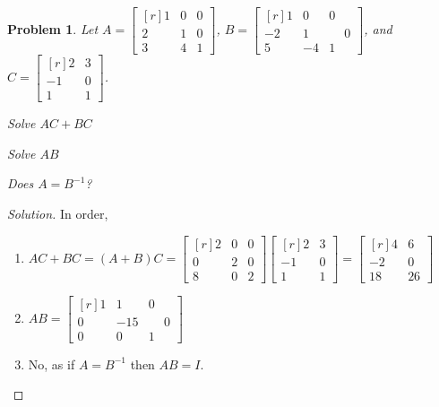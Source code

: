 \documentclass{article}
\theoremstyle{mystyle}
\newtheorem{problem}{Problem}[section]
\begin{document}
\begin{problem}
Let $A = \begin{bmatrix*}[r] 1 & 0 & 0 \\ 2 & 1 & 0 \\ 3 & 4 & 1 \end{bmatrix*}$, $B=\begin{bmatrix*}[r]1 & 0 & 0 \\ -2 & 1 & \phantom{-}0 \\ 5 & -4 & 1 \end{bmatrix*}$, and $C = \begin{bmatrix*}[r] 2 & 3 \\ -1 & 0 \\ 1 & 1 \end{bmatrix*}$. 
\begin{enumerate}
\begin{multicols}{3}
    \item Solve $AC+BC$
    \item Solve $AB$
    \item Does $A = B^{-1}$?
\end{multicols}
\end{enumerate}
\end{problem}
\begin{proof}[Solution]
In order,
\begin{enumerate}
    \item $AC+BC = (A+B)C = \begin{bmatrix*}[r] 2 & 0 & 0 \\ 0 & 2 & 0 \\ 8 & 0 & 2 \end{bmatrix*} \begin{bmatrix*}[r] 2 & 3 \\ -1 & 0 \\ 1 & 1 \end{bmatrix*} = \begin{bmatrix*}[r] 4 & 6 \\ -2 & 0 \\ 18 & 26 \end{bmatrix*}$
    \item $AB = \begin{bmatrix*}[r] 1 & 1 & 0 \\ 0 & -15 & \phantom{-}0 \\ 0 & 0 & 1 \end{bmatrix*}$
    \item No, as if $A=B^{-1}$ then $AB=I$.
\end{enumerate}
\end{proof}
\end{document}
